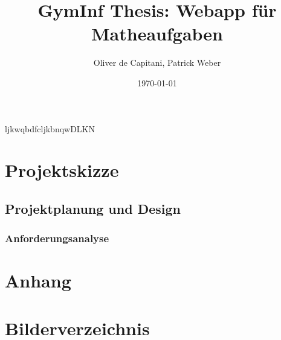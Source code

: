 \documentclass[12pt,a4paper]{article} %
\title{GymInf Thesis: Webapp für Matheaufgaben}
\date{\today}
\author{Oliver de Capitani, Patrick Weber}
\begin{document}
ljkwqbdfcljkbnqwDLKN
\maketitle %
% 











\newpage %
\tableofcontents %











\newpage


\section{Projektskizze}
\subsection{Projektplanung und Design}
\subsubsection{Anforderungsanalyse}



\newpage
   
  
\appendix
\section{Anhang}
\newpage





\section{Bilderverzeichnis}
\listoffigures
\end{document}
